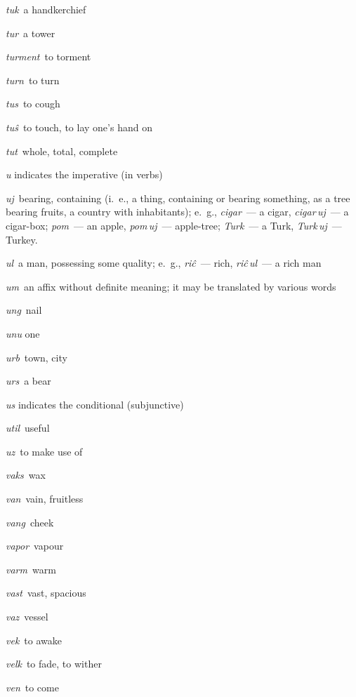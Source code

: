 \begin{landscape}
\begin{multicols}{5}
\begin{outdent}{1em}
\emph{tuk\,} a handkerchief

\emph{tur\,} a tower

\emph{turment\,} to torment

\emph{turn\,} to turn

\emph{tus\,} to cough

\emph{tuŝ\,} to touch, to lay one’s hand on 

\emph{tut\,} whole, total, complete
\end{outdent}


\begin{outdent}{1em}
\emph{u} indicates the imperative (in verbs)

\emph{uj\,} bearing, containing (i.~e., a thing, containing
or bearing something, as a tree bearing fruits, a country with inhabitants);
e.~g., \emph{cigar\,} — a cigar, \emph{cigar\,uj\,} — a cigar-box; \emph{pom\,} — an apple, \emph{pom\,uj\,} — apple-tree; \emph{Turk\,} — a Turk, \emph{Turk\,uj\,} — Turkey.

\emph{ul\,} a man, possessing some quality; e.~g., \emph{riĉ\,} — rich, \emph{riĉ\,ul\,} — a rich man

\emph{um\,} an affix without definite meaning; it may be translated by various words

\emph{ung\,} nail

\emph{unu} one

\emph{urb\,} town, city

\emph{urs\,} a bear

\emph{us} indicates the conditional (subjunctive)

\emph{util\,} useful

\emph{uz\,} to make use of 
\end{outdent}


\begin{outdent}{1em}
\emph{vaks\,} wax

\emph{van\,} vain, fruitless

\emph{vang\,} cheek

\emph{vapor\,} vapour

\emph{varm\,} warm

\emph{vast\,} vast, spacious

\emph{vaz\,} vessel

\emph{vek\,} to awake

\emph{velk\,} to fade, to wither

\emph{ven\,} to come


\end{outdent}
\end{multicols}
\end{landscape}
